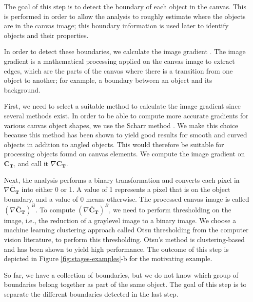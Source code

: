 The goal of this step is to detect the boundary of each object in the canvas.
This is performed in order to allow the analysis to roughly estimate where the objects are in the canvas image; this boundary information is used later to identify objects and their properties.

In order to detect these boundaries, we calculate the image gradient \cite{fernandez2012advanced}.
The image gradient is a mathematical processing applied on the canvas image to extract edges, which are the parts of the canvas where there is a transition from one object to another; for example, a boundary between an object and its background.

First, we need to select a suitable method to calculate the image gradient since several methods exist.
In order to be able to compute more accurate gradients for various canvas object shapes, we use the Scharr method \cite{scharr2000optimal}.
We make this choice because this method has been shown \cite{kroon2009numerical} to yield good results for smooth and curved objects in addition to angled objects.
 This would therefore be suitable for processing objects found on canvas elements.
  We compute the image gradient on $\mathbf{\bar{C}_T}$, and call it $\nabla \mathbf{\bar{C}_T}$.

Next, the analysis performs a binary transformation and converts each pixel in $\nabla \mathbf{\bar{C}_T}$ into either 0 or 1.
 A value of 1 represents a pixel that is on the object boundary, and a value of 0 means otherwise.
  The processed canvas image is called $(\nabla \mathbf{\bar{C}_T})^B$. 
To compute $(\nabla \mathbf{\bar{C}_T})^B$, we need to perform thresholding on the image, i.e., the reduction of a graylevel image to a binary image. 
We choose a machine learning clustering approach called Otsu thresholding from the computer vision literature, to perform this thresholding.
 Otsu's method is clustering-based and has been shown \cite{sezgin2004survey} to yield high performance. The outcome of this step is depicted in Figure \ref{fig:stages-examples}-b for the motivating example. 


So far, we have a collection of boundaries, but we do not know which group of boundaries belong together as part of the same object.
The goal of this step is to separate the different boundaries detected in the last step. 

